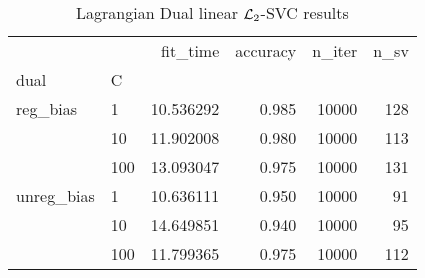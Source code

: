 \begin{table}[H]
\centering
\caption{Lagrangian Dual linear $\protect \mathcal{L}_2$-SVC results}
\label{linear_lagrangian_dual_l2_svc_cv_results}
\begin{tabular}{llrrrr}
\toprule
           &     &   fit\_time &  accuracy &  n\_iter &  n\_sv \\
dual & C &            &           &         &       \\
\midrule
reg\_bias & 1   &  10.536292 &     0.985 &   10000 &   128 \\
           & 10  &  11.902008 &     0.980 &   10000 &   113 \\
           & 100 &  13.093047 &     0.975 &   10000 &   131 \\
unreg\_bias & 1   &  10.636111 &     0.950 &   10000 &    91 \\
           & 10  &  14.649851 &     0.940 &   10000 &    95 \\
           & 100 &  11.799365 &     0.975 &   10000 &   112 \\
\bottomrule
\end{tabular}
\end{table}
